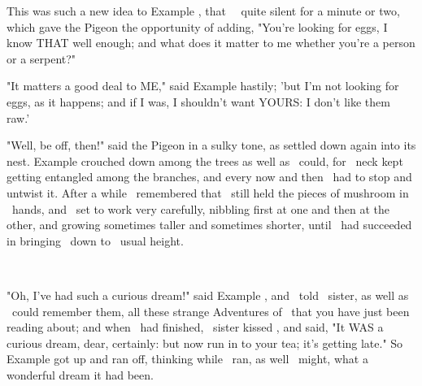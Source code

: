 \documentclass{article}
\begin{document}
\set
This was such a new idea to  Example , that \they\ \were\ quite silent for a minute or two, which gave the Pigeon the opportunity of adding, "You're looking for eggs, I know THAT well enough; and what does it matter to me whether you're a person or a serpent?"

\set
"It matters a good deal to ME," said  Example  hastily; 'but I'm not looking for eggs, as it happens; and if I was, I shouldn't want YOURS: I don't like them raw.'

\set
"Well, be off, then!" said the Pigeon in a sulky tone, as \they[2] settled down again into its nest.  Example  crouched down among the trees as well as \they\ could, for \their\ neck kept getting entangled among the branches, and every now and then \they\ had to stop and untwist it. After a while \they\ remembered that \they\ still held the pieces of mushroom in \their\ hands, and \they\ set to work very carefully, nibbling first at one and then at the other, and growing sometimes taller and sometimes shorter, until \they\ had succeeded in bringing \themself\ down to \their\ usual height.

~

\set
"Oh, I've had such a curious dream!" said  Example , and \they\ told \their\ sister, as well as \they\ could remember them, all these strange Adventures of \theirs\ that you have just been reading about; and when \they\ had finished, \their\ sister kissed \them, and said, "It WAS a curious dream, dear, certainly: but now run in to your tea; it's getting late." So  Example  got up and ran off, thinking while \they\ ran, as well \they\ might, what a wonderful dream it had been.
\end{document}
